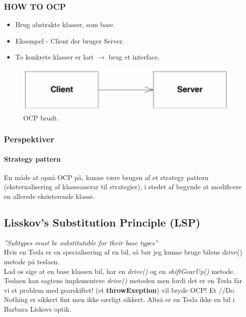 \subsubsection{HOW TO OCP}

\begin{itemize}
	\item Brug abstrakte klasser, som base.
	\item Eksempel - Client der bruger Server.
	\item To konkrete klasser er lort $\longrightarrow$ brug et interface.
\end{itemize}

\begin{figure}[H]
\centering
\includegraphics[width=0.7\linewidth]{figs/OCP/clientServer.PNG}
\caption{OCP brudt.}
\label{fig:clientServer}
\end{figure}


\subsubsection{Perspektiver}

\paragraph{Strategy pattern} 
En måde at opnå OCP på, kunne være brugen af et strategy pattern (eksternalisering af klasseansvar til strategier), i stedet af begynde at modificere en allerede eksisterende klasse. 

\subsection{Lisskov's Substitution Principle (LSP)}
\textit{''Subtypes must be substitutable for their base types''}\\

Hvis en Tesla er en specialisering af en bil, så bør jeg kunne bruge bilens drive() metode på teslaen.\\

Lad os sige at en base klassen bil, har en \textit{drive()} og en \textit{shiftGearUp()} metode. Teslaen kan sagtens implementere \textit{drive()} metoden men fordi det er en Tesla får vi et problem med gearskiftet! (et \textbf{throwExeption}) vil bryde OCP! Et \textcolor{green!60!black}{//Do Nothing} er sikkert fint men ikke særligt sikkert. Altså er en Tesla ikke en bil i Barbara Liskovs optik.\\

